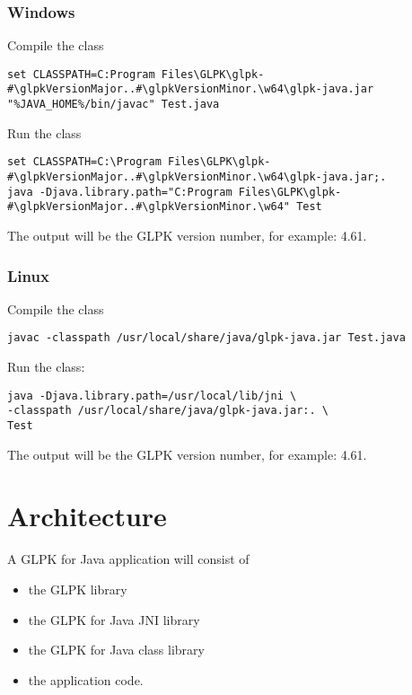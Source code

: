 \documentclass[a4paper,11pt]{report}
\newcommand{\glpkVersionMajor}{4}
\newcommand{\glpkVersionMinor}{61}
\begin{document}
\subsection{Windows}

Compile the class

\begin{lstlisting}
set CLASSPATH=C:Program Files\GLPK\glpk-#\glpkVersionMajor..#\glpkVersionMinor.\w64\glpk-java.jar
"%JAVA_HOME%/bin/javac" Test.java
\end{lstlisting}

Run the class

\begin{lstlisting}
set CLASSPATH=C:\Program Files\GLPK\glpk-#\glpkVersionMajor..#\glpkVersionMinor.\w64\glpk-java.jar;.
java -Djava.library.path="C:Program Files\GLPK\glpk-#\glpkVersionMajor..#\glpkVersionMinor.\w64" Test
\end{lstlisting}

The output will be the GLPK version number, for example: \glpkVersionMajor.\glpkVersionMinor.

\subsection{Linux}
Compile the class

\begin{lstlisting}
javac -classpath /usr/local/share/java/glpk-java.jar Test.java
\end{lstlisting}

Run the class:

\begin{lstlisting}
java -Djava.library.path=/usr/local/lib/jni \
-classpath /usr/local/share/java/glpk-java.jar:. \
Test
\end{lstlisting}

The output will be the GLPK version number, for example: \glpkVersionMajor.\glpkVersionMinor.

\chapter{Architecture}
A GLPK for Java application will consist of
\begin{itemize}
\item the GLPK library
\item the GLPK for Java JNI library
\item the GLPK for Java class library
\item the application code.
\end{itemize}
\end{document}
